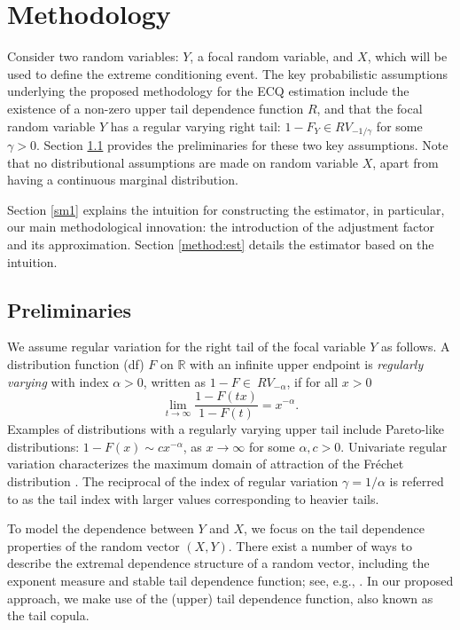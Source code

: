 \documentclass[11pt,letterpaper]{article}
\def\a{\alpha}
\def\g{\gamma}
\def\rbb{{\mathbb R}}
\def\nf{\infty}
\numberwithin{equation}{section}
\begin{document}
\section{Methodology}\label{smethod}

Consider two random variables: $Y$, a focal random variable, and $X$, which will be used to define the extreme conditioning event.  The key probabilistic assumptions underlying the proposed methodology for the ECQ estimation include the existence of a non-zero upper tail dependence function $R$, and that the focal random variable $Y$ has a regular varying right tail: $1-F_Y\in RV_{-1/\g}$ for some $\g>0$. Section \ref{sbg} provides the preliminaries for these two key assumptions.
Note that no distributional assumptions are made on random variable $X$, apart from having a continuous marginal distribution.


Section \ref{sm1} explains the intuition for constructing the estimator, in particular, our main methodological innovation: the introduction of the adjustment factor and its approximation. Section \ref{method:est} details the estimator based on the intuition.

\subsection{Preliminaries}\label{sbg}
We assume regular variation for the right tail of the focal variable $Y$ as follows. A distribution function (df) $F$ on $\rbb$ with an infinite upper endpoint is  \emph{regularly varying} with index $\a>0$, written as $1-F\in\ RV_{-\a}$, if for all $x>0$ $$\lim_{t\to\nf}\dfrac{1-F(tx)}{1-F(t)} = x^{-\a}.$$
Examples of distributions with a regularly varying upper tail include Pareto-like distributions: $1-F(x)\sim cx^{-\a}$, as $x\to\nf$ for some $\a,c>0.$
Univariate regular variation characterizes the maximum domain of attraction of the Fr\'echet  distribution \citep{Gnedenko1943}. The reciprocal of the index of regular variation $\g=1/\alpha$ is referred to as the tail index with larger values corresponding to heavier tails. 

To model the dependence between $Y$ and $X$, we focus on the tail dependence properties of the random vector $(X,Y)$. There exist a number of ways to describe the extremal dependence structure of a random vector, including the exponent measure and stable tail dependence function; see, e.g., \cite{dHF2006}. In our proposed approach, we make use of the (upper) tail dependence function, also known as the tail copula.
\end{document}
